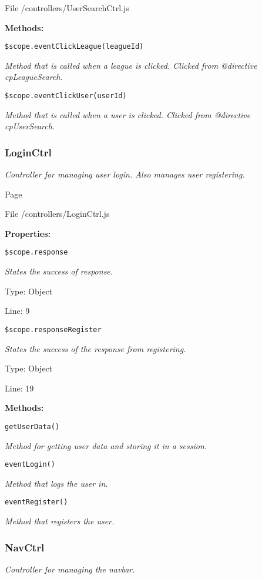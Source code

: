 File /controllers/UserSearchCtrl.js

\textbf{Methods:}

\texttt{\$scope.eventClickLeague(leagueId)}

{\scriptsize
\textit{Method that is called when a league is clicked.
Clicked from @directive cpLeagueSearch.}

}

\texttt{\$scope.eventClickUser(userId)}

{\scriptsize
\textit{Method that is called when a user is clicked.
Clicked from @directive cpUserSearch.}

}

\subsubsection{LoginCtrl}
\textit{Controller for managing user login.
Also manages user registering.}

Page \pageref{LoginCtrl.js}

File /controllers/LoginCtrl.js

\textbf{Properties:}

\texttt{\$scope.response}

{\scriptsize
\textit{States the success of response.}

Type: Object

Line: 9

}
\texttt{\$scope.responseRegister}

{\scriptsize
\textit{States the success of the response from registering.}

Type: Object

Line: 19

}
\textbf{Methods:}

\texttt{getUserData()}

{\scriptsize
\textit{Method for getting user data and storing it in a session.}

}

\texttt{eventLogin()}

{\scriptsize
\textit{Method that logs the user in.}

}

\texttt{eventRegister()}

{\scriptsize
\textit{Method that registers the user.}

}

\subsubsection{NavCtrl}
\textit{Controller for managing the navbar.}


